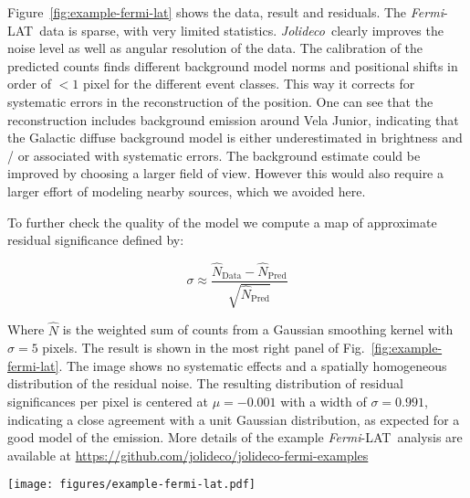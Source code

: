 \documentclass[twocolumn]{aastex631}
\newcommand{\fermi}{\textit{Fermi}-LAT~}
\newcommand{\jolideco}{\textit{Jolideco}~}
\begin{document}
    Figure~\ref{fig:example-fermi-lat} shows the data, result and residuals. The \fermi data is sparse, with very limited statistics. \jolideco clearly improves the noise level as well as angular resolution of the data. The calibration of the predicted counts finds different background model norms and positional shifts in order of $<1$ pixel for the different event classes. This way it corrects for systematic errors in the reconstruction of the position. One can see that the reconstruction includes background emission around Vela Junior, indicating that the Galactic diffuse background model is either underestimated in brightness and / or associated with systematic errors. The background estimate could be improved by choosing a larger field of view. However this would also require a larger effort of modeling nearby sources, which we avoided here.
    
    To further check the quality of the model we compute a map of approximate residual significance defined by:

    \begin{equation}
        \label{eq:approx-sigma}
        \sigma \approx \frac{\hat{N}_{\mathrm{Data}} - \hat{N}_{\mathrm{Pred}}} {\sqrt{\hat{N}_{\mathrm{Pred}}}}
    \end{equation}

    Where $\hat{N}$ is the weighted sum of counts from a Gaussian smoothing kernel with $\sigma=5$ pixels. The result is shown in the most right panel of Fig.~\ref{fig:example-fermi-lat}. The image
    shows no systematic effects and a spatially homogeneous distribution of the residual noise. The resulting distribution of residual significances per pixel is centered at $\mu=-0.001$ with a width of $\sigma=0.991$, indicating a close agreement with a unit Gaussian distribution, as expected for a good model of the emission. More details of the example \fermi analysis are available at \url{https://github.com/jolideco/jolideco-fermi-examples}
    
      \begin{figure*}
        \begin{centering}
            \texttt{[image: figures/example-fermi-lat.pdf]}
            \caption{
                Illustration of the result of the \jolideco method applied to \fermi data of the supernova remnant \textit{RX J0852.0-4622} or \textit{Vela Junior}. The left image shows the counts above \qty[mode = text]{10}{GeV}. The different event classes are stacked into a single image. The image in the center shows the flux reconstructed by the \jolideco method. The image on the right shows the residuals as computed by Equation~\ref{eq:approx-sigma} and smoothed with a \textit{Gaussian} kernel of width 5~pixels. More information on this analysis example can be found on \url{https://github.com/jolideco/jolideco-fermi-examples}.
            }
            \label{fig:example-fermi-lat}
        \end{centering}
    \end{figure*}
    
\end{document}
